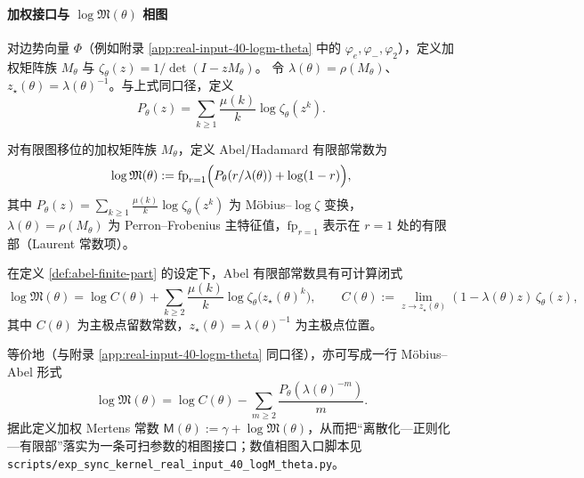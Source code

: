 \paragraph{加权接口与 \texorpdfstring{$\log\mathfrak{M}(\theta)$}{logM(theta)} 相图}
对边势向量 $\Phi$（例如附录 \ref{app:real-input-40-logm-theta} 中的 $\varphi_e,\varphi_-,\varphi_2$），定义加权矩阵族 $M_\theta$ 与
\(
\zeta_\theta(z)=1/\det(I-zM_\theta)
\)。
令 $\lambda(\theta)=\rho(M_\theta)$、$z_\star(\theta)=\lambda(\theta)^{-1}$。与上式同口径，定义
\[
P_\theta(z)=\sum_{k\ge 1}\frac{\mu(k)}{k}\log\zeta_\theta(z^k).
\]
\begin{definition}\label{def:abel-finite-part}
对有限图移位的加权矩阵族 $M_\theta$，定义 Abel/Hadamard 有限部常数为
\[
\log\mathfrak{M}(\theta):=\mathrm{fp}_{r=1}\Bigl(P_\theta(r/\lambda(\theta))+\log(1-r)\Bigr),
\]
其中 $P_\theta(z)=\sum_{k\ge 1}\frac{\mu(k)}{k}\log\zeta_\theta(z^k)$ 为 Möbius--$\log\zeta$ 变换，$\lambda(\theta)=\rho(M_\theta)$ 为 Perron--Frobenius 主特征值，$\mathrm{fp}_{r=1}$ 表示在 $r=1$ 处的有限部（Laurent 常数项）。
\end{definition}
\begin{proposition}\label{prop:abel-finite-part-mobius-zeta}
在定义 \ref{def:abel-finite-part} 的设定下，Abel 有限部常数具有可计算闭式
\[
\log\mathfrak{M}(\theta)
=\log C(\theta)+\sum_{k\ge 2}\frac{\mu(k)}{k}\log\zeta_\theta\bigl(z_\star(\theta)^k\bigr),
\qquad
C(\theta):=\lim_{z\to z_\star(\theta)}(1-\lambda(\theta)z)\,\zeta_\theta(z),
\]
其中 $C(\theta)$ 为主极点留数常数，$z_\star(\theta)=\lambda(\theta)^{-1}$ 为主极点位置。
\end{proposition}
等价地（与附录 \ref{app:real-input-40-logm-theta} 同口径），亦可写成一行 Möbius--Abel 形式
\[
\log\mathfrak{M}(\theta)=\log C(\theta)-\sum_{m\ge 2}\frac{P_\theta(\lambda(\theta)^{-m})}{m}.
\]
据此定义加权 Mertens 常数
\(
\mathsf{M}(\theta):=\gamma+\log\mathfrak{M}(\theta)
\)，从而把“离散化—正则化—有限部”落实为一条可扫参数的相图接口；数值相图入口脚本见
\texttt{scripts/exp\_sync\_kernel\_real\_input\_40\_logM\_theta.py}。

